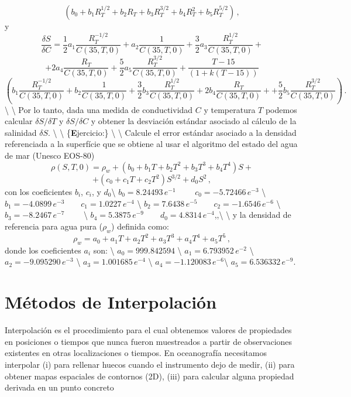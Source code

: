 \documentclass[
]{agujournal2019}
\begin{document}
\[\left (b_0+b_1 R_T^{1/2}+b_2 R_T+b_3 R_T^{3/2}+b_4 R_T^{2}+b_5 R_T^{5/2}\right)\,,\]
y \[\frac{\delta{S}}{\delta{C}}=
                 \frac{1}{2} a_1 \frac{R_T^{-1/2}}{C(35,T,0)} +
         a_2 \frac{1}{C(35,T,0)} +
             \frac{3}{2}a_3 \frac{R_T^{1/2}}{C(35,T,0)}+ \]
\[+2 a_4 \frac{R_T}{C(35,T,0)} +\frac{5}{2} a_5 \frac{R_T^{3/2}}{C(35,T,0)}
     +\frac{T-15}{(1+k(T-15))}\] \[\left(
        b_1 \frac{R_T^{-1/2}}{C(35,T,0)} +
         b_2 \frac{1}{C(35,T,0)} +
             \frac{3}{2}b_3 \frac{R_T^{1/2}}{C(35,T,0)}+
               2 b_4 \frac{R_T}{C(35,T,0)} +
     +\frac{5}{2} b_5 \frac{R_T^{3/2}}{C(35,T,0)}
     \right)\,.\] \textbackslash{} \textbackslash{} \noindent Por lo
tanto, dada una medida de conductividad \(C\) y temperatura \(T\)
podemos calcular \({\delta{S}}/{\delta{T}}\) y
\({\delta{S}}/{\delta{C}}\) y obtener la desviación estándar asociado al
cálculo de la salinidad \(\delta{S}\). \textbackslash{} \textbackslash{}
\{\textbf Ejercicio:\} \textbackslash{} \textbackslash{}
\noindent Calcule el error estándar asociado a la densidad referenciada
a la superfície que se obtiene al usar el algoritmo del estado del agua
de mar (Unesco EOS-80)
\[\rho(S,T,0)=\rho_w + \left(b_0+b_1 T+b_2 T^2+b_3 T^{3}+b_4 T^{4}\right) S +\]
\[+\left(c_0+c_1 T+c_2 T^2\right) S^{3/2} + d_0 S^2\,,\] con los
coeficientes \(b_i\), \(c_i\), y \(d_0\)\textbackslash{}
\(b_0=8.24493\,e^{-1}\,\,\,\,\,\,\,\,\,\,\,\,\,\,c_0=-5.72466\,e^{-3}\)
\textbackslash{}
\(b_1=-4.0899\,e^{-3}\,\,\,\,\,\,\,\,\,\,\,\,c_1=1.0227\,e^{-4}\)
\textbackslash{}
\(b_2=7.6438\,e^{-5}\,\,\,\,\,\,\,\,\,\,\,\,c_2=-1.6546\,e^{-6}\)
\textbackslash{} \(b_3=-8.2467\,e^{-7}\,\,\,\,\,\,\,\,\,\,\,\,\)
\textbackslash{}
\(b_4=5.3875\,e^{-9}\,\,\,\,\,\,\,\,\,\,\,\,d_0=4.8314\,e^{-4}\),,\textbackslash{}
\textbackslash{} y la densidad de referencia para agua pura (\(\rho_w\))
definida como:
\[\rho_w=a_0+a_1 T+a_2 T^2+a_3 T^{3}+a_4 T^{4}+a_5 T^{5}\,,\] donde los
coeficientes \(a_i\) son: \textbackslash{} \(a_0=999.842594\)
\textbackslash{} \(a_1=6.793952\,e^{-2}\) \textbackslash{}
\(a_2=-9.095290\,e^{-3}\) \textbackslash{} \(a_3=1.001685\,e^{-4}\)
\textbackslash{} \(a_4=-1.120083\,e^{-6}\)\textbackslash{}
\(a_5=6.536332\,e^{-9}\).

\section{Métodos de Interpolación}

Interpolación es el procedimiento para el cual obtenemos valores de
propiedades en posiciones o tiempos que nunca fueron muestreados a
partir de observaciones existentes en otras localizaciones o tiempos. En
oceanografía necesitamos interpolar (i) para rellenar huecos cuando el
instrumento dejo de medir, (ii) para obtener mapas espaciales de
contornos (2D), (iii) para calcular alguna propiedad derivada en un
punto concreto
\end{document}
